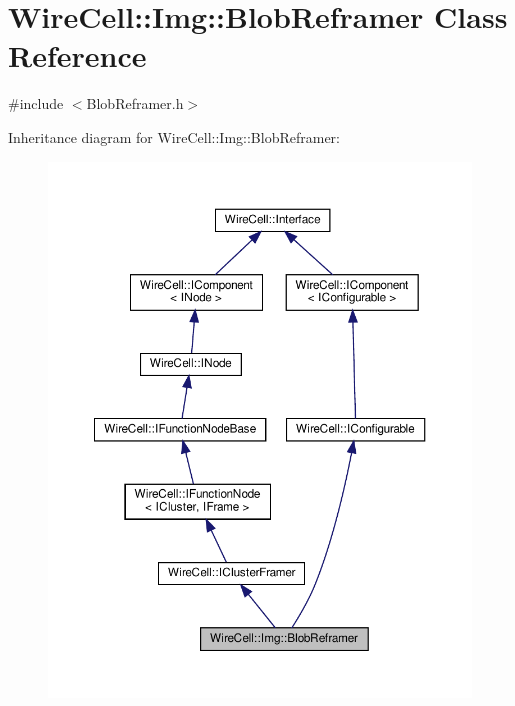 \hypertarget{class_wire_cell_1_1_img_1_1_blob_reframer}{}\section{Wire\+Cell\+:\+:Img\+:\+:Blob\+Reframer Class Reference}
\label{class_wire_cell_1_1_img_1_1_blob_reframer}


{\ttfamily \#include $<$Blob\+Reframer.\+h$>$}



Inheritance diagram for Wire\+Cell\+:\+:Img\+:\+:Blob\+Reframer\+:
\nopagebreak
\begin{figure}[H]
\begin{center}
\leavevmode
\includegraphics[width=350pt]{class_wire_cell_1_1_img_1_1_blob_reframer__inherit__graph}
\end{center}
\end{figure}


